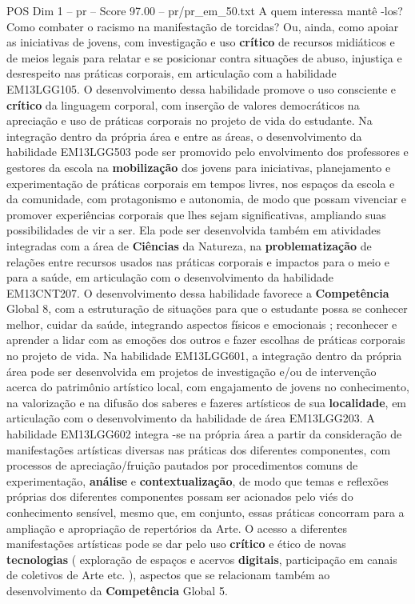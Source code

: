 \begin{textsample}{POS Dim 1 – pr – Score 97.00 – pr/pr\_em\_50.txt}
A quem interessa mantê -los?
Como combater o racismo na manifestação de torcidas?
Ou, ainda, como apoiar as iniciativas de jovens, com investigação e uso \textbf{crítico} de recursos midiáticos e de meios legais para relatar e se posicionar contra situações de abuso, injustiça e desrespeito nas práticas corporais, em articulação com a habilidade EM13LGG105.
O desenvolvimento dessa habilidade promove o uso consciente e \textbf{crítico} da linguagem corporal, com inserção de valores democráticos na apreciação e uso de práticas corporais no projeto de vida do estudante.
Na integração dentro da própria área e entre as áreas, o desenvolvimento da habilidade EM13LGG503 pode ser promovido pelo envolvimento dos professores e gestores da escola na \textbf{mobilização} dos jovens para iniciativas, planejamento e experimentação de práticas corporais em tempos livres, nos espaços da escola e da comunidade, com protagonismo e autonomia, de modo que possam vivenciar e promover experiências corporais que lhes sejam significativas, ampliando suas possibilidades de vir a ser.
Ela pode ser desenvolvida também em atividades integradas com a área de \textbf{Ciências} da Natureza, na \textbf{problematização} de relações entre recursos usados nas práticas corporais e impactos para o meio e para a saúde, em articulação com o desenvolvimento da habilidade EM13CNT207.
O desenvolvimento dessa habilidade favorece a \textbf{Competência} Global 8, com a estruturação de situações para que o estudante possa se conhecer melhor, cuidar da saúde, integrando aspectos físicos e emocionais ; reconhecer e aprender a lidar com as emoções dos outros e fazer escolhas de práticas corporais no projeto de vida.
Na habilidade EM13LGG601, a integração dentro da própria área pode ser desenvolvida em projetos de investigação e/ou de intervenção acerca do patrimônio artístico local, com engajamento de jovens no conhecimento, na valorização e na difusão dos saberes e fazeres artísticos de sua \textbf{localidade}, em articulação com o desenvolvimento da habilidade de área EM13LGG203.
A habilidade EM13LGG602 integra -se na própria área a partir da consideração de manifestações artísticas diversas nas práticas dos diferentes componentes, com processos de apreciação/fruição pautados por procedimentos comuns de experimentação, \textbf{análise} e \textbf{contextualização}, de modo que temas e reflexões próprias dos diferentes componentes possam ser acionados pelo viés do conhecimento sensível, mesmo que, em conjunto, essas práticas concorram para a ampliação e apropriação de repertórios da Arte.
O acesso a diferentes manifestações artísticas pode se dar pelo uso \textbf{crítico} e ético de novas \textbf{tecnologias} ( exploração de espaços e acervos \textbf{digitais}, participação em canais de coletivos de Arte etc. ), aspectos que se relacionam também ao desenvolvimento da \textbf{Competência} Global 5.

\end{textsample}
